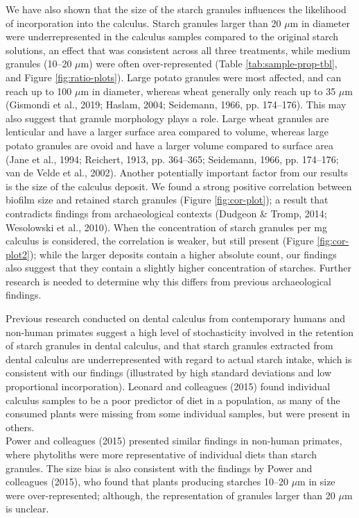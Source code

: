 \documentclass[
]{article}
\begin{document}
We have also shown that the size of the starch granules influences the likelihood
of incorporation into the calculus. Starch granules larger than 20 \(\mu\)m in
diameter were underrepresented in the calculus samples compared to the original
starch solutions, an effect that was consistent across all three treatments,
while medium granules (10--20 \(\mu\)m) were often over-represented
(Table \ref{tab:sample-prop-tbl},
and
Figure \ref{fig:ratio-plots}).
Large potato granules were most affected, and can reach up to 100 \(\mu\)m
in diameter, whereas wheat generally only reach up to 35 \(\mu\)m
(Gismondi et al., 2019; Haslam, 2004; Seidemann, 1966, pp. 174--176).
This may also suggest that granule morphology plays a role. Large wheat granules
are lenticular and have a larger surface area compared
to volume, whereas large potato granules are ovoid and have a larger volume
compared to surface area
(Jane et al., 1994; Reichert, 1913, pp. 364--365; Seidemann, 1966, pp. 174--176; van de Velde et al., 2002).
Another potentially important factor
from our results is the size of the calculus deposit. We found a
strong positive correlation between biofilm size and retained
starch granules (Figure \ref{fig:cor-plot});
a result that contradicts findings from archaeological contexts
(Dudgeon \& Tromp, 2014; Wesolowski et al., 2010).
When the concentration of starch granules
per mg calculus is considered, the correlation is weaker, but still present
(Figure \ref{fig:cor-plot2});
while the larger deposits contain a higher absolute count, our findings also suggest
that they contain a slightly higher concentration of starches.
Further research is needed to determine why this differs from previous archaeological
findings.

Previous research conducted on dental calculus from contemporary humans and non-human
primates suggest a high level of stochasticity involved in the retention of
starch granules in dental calculus, and that starch granules extracted from dental
calculus are underrepresented with regard
to actual starch intake, which is consistent with our findings (illustrated by high
standard deviations and low proportional incorporation).
Leonard and colleagues (2015) found individual
calculus samples to be a poor predictor of diet in a population, as many of the
consumed plants were missing from some individual samples, but were present in others.\\
Power and colleagues (2015)
presented similar findings in non-human primates, where phytoliths were more
representative of individual diets than starch granules.
The size bias is also consistent with the findings by Power and colleagues
(2015),
who found that plants producing starches 10--20 \(\mu\)m in
size were over-represented; although, the representation of granules larger than
20 \(\mu\)m is unclear.
\end{document}
